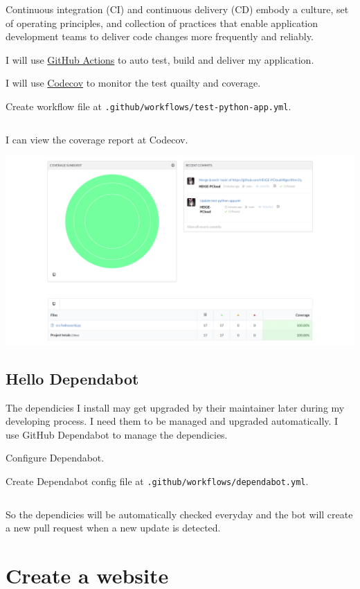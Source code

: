 \documentclass[a4paper]{report}
\begin{document}
Continuous integration (CI) and continuous delivery (CD) embody a culture, set of operating principles, and collection of practices that enable application development teams to deliver code changes more frequently and reliably.

I will use \href{https://github.com/features/actions}{GitHub Actions} to auto test, build and deliver my application. 

I will use \href{https://codecov.io/}{Codecov} to monitor the test quailty and coverage.

Create workflow file at \texttt{.github/workflows/test-python-app.yml}.

\inputminted{yaml}{../.github/workflows/build-app.yml}

I can view the coverage report at Codecov.

\includegraphics[width=\linewidth]{Codecov.png}

\subsection{Hello Dependabot}

The dependicies I install may get upgraded by their maintainer later during my developing process. I need them to be managed and upgraded automatically. I use GitHub Dependabot to manage the dependicies.

Configure Dependabot.

Create Dependabot config file at \texttt{.github/workflows/dependabot.yml}.

\inputminted{yaml}{../.github/dependabot.yml}

So the dependicies will be automatically checked everyday and the bot will create a new pull request when a new update is detected.

\section{Create a website}
\end{document}
